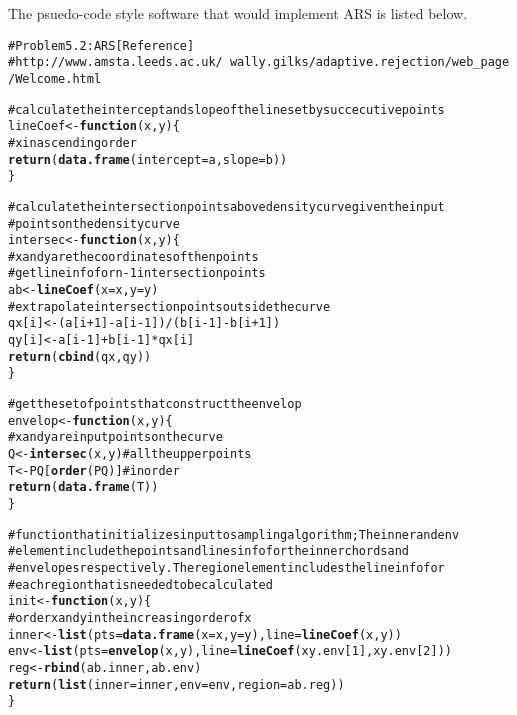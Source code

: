 \documentclass{article}\usepackage{graphicx, color}
\makeatletter
\newcommand{\hlfunctioncall}[1]{\textcolor[rgb]{0.501960784313725,0,0.329411764705882}{\textbf{#1}}}%
\newcommand{\hlcomment}[1]{\textcolor[rgb]{0.180392156862745,0.6,0.341176470588235}{#1}}%
\newenvironment{kframe}{%
 \def\at@end@of@kframe{}%
 \ifinner\ifhmode%
  \def\at@end@of@kframe{\end{minipage}}%
  \begin{minipage}{\columnwidth}%
 \fi\fi%
 \def\FrameCommand##1{\hskip\@totalleftmargin \hskip-\fboxsep
 \colorbox{shadecolor}{##1}\hskip-\fboxsep
     \hskip-\linewidth \hskip-\@totalleftmargin \hskip\columnwidth}%
 \MakeFramed {\advance\hsize-\width
   \@totalleftmargin\z@ \linewidth\hsize
   \@setminipage}}%
 {\par\unskip\endMakeFramed%
 \at@end@of@kframe}
\newenvironment{knitrout}{}{} %
\makeatother
\begin{document}
\hspace{12 pt} The psuedo-code style software that would implement ARS is listed below.
\begin{knitrout}
\color{fgcolor}\begin{kframe}
\begin{alltt}
\hlcomment{# Problem 5.2: ARS [Reference]}
\hlcomment{# http://www.amsta.leeds.ac.uk/~wally.gilks/adaptive.rejection/web_page/Welcome.html}

\hlcomment{# calculate the intercept and slope of the line set by succecutive points}
lineCoef <- \hlfunctioncall{function}(x, y) \{
\hlcomment{    # x in ascending order}
    \hlfunctioncall{return}(\hlfunctioncall{data.frame}(intercept = a, slope = b))
\}

\hlcomment{# calculate the intersection points above density curve given the input}
\hlcomment{# points on the density curve}
intersec <- \hlfunctioncall{function}(x, y) \{
\hlcomment{    # x and y are the coordinates of the n points}
\hlcomment{    # get line info for n-1 intersection points}
    ab <- \hlfunctioncall{lineCoef}(x = x, y = y)
\hlcomment{    # extrapolate intersection points outside the curve}
    qx[i] <- (a[i + 1] - a[i - 1])/(b[i - 1] - b[i + 1])
    qy[i] <- a[i - 1] + b[i - 1] * qx[i]
    \hlfunctioncall{return}(\hlfunctioncall{cbind}(qx, qy))
\}

\hlcomment{# get the set of points that construct the envelop}
envelop <- \hlfunctioncall{function}(x, y) \{
\hlcomment{    # x and y are input points on the curve}
    Q <- \hlfunctioncall{intersec}(x, y)  \hlcomment{# all the upper points}
    T <- PQ[\hlfunctioncall{order}(PQ)]  \hlcomment{# in order}
    \hlfunctioncall{return}(\hlfunctioncall{data.frame}(T))
\}

\hlcomment{# function that initializes input to sampling algorithm; The inner and env}
\hlcomment{# element include the points and lines info for the inner chords and}
\hlcomment{# envelopes respectively.  The region element includes the line info for}
\hlcomment{# each region that is needed to be calculated}
init <- \hlfunctioncall{function}(x, y) \{
\hlcomment{    # order x and y in the increasing order of x}
    inner <- \hlfunctioncall{list}(pts = \hlfunctioncall{data.frame}(x = x, y = y), line = \hlfunctioncall{lineCoef}(x, y))
    env <- \hlfunctioncall{list}(pts = \hlfunctioncall{envelop}(x, y), line = \hlfunctioncall{lineCoef}(xy.env[1], xy.env[2]))
    reg <- \hlfunctioncall{rbind}(ab.inner, ab.env)
    \hlfunctioncall{return}(\hlfunctioncall{list}(inner = inner, env = env, region = ab.reg))
\}


\end{alltt}
\end{kframe}
\end{knitrout}
\end{document}
